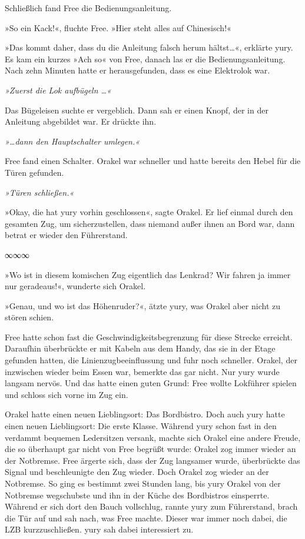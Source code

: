 Schließlich fand Free die Bedienungsanleitung.

»So ein Kack!«, fluchte Free. »Hier steht alles auf Chinesisch!«

»Das kommt daher, dass du die Anleitung falsch herum hältst…«, erklärte yury. Es kam ein kurzes »Ach so« von Free, danach las er die Bedienungsanleitung. Nach zehn Minuten hatte er herausgefunden, dass es eine Elektrolok war.

\textit{»Zuerst die Lok aufbügeln …«}

Das Bügeleisen suchte er vergeblich. Dann sah er einen Knopf, der in der Anleitung abgebildet war. Er drückte ihn.

\textit{»…dann den Hauptschalter umlegen.«}

Free fand einen Schalter. Orakel war schneller und hatte bereits den Hebel für die Türen gefunden.

\textit{»Türen schließen.«}

»Okay, die hat yury vorhin geschlossen«, sagte Orakel. Er lief einmal durch den gesamten Zug, um sicherzustellen, dass niemand außer ihnen an Bord war, dann betrat er wieder den Führerstand.

\begin{center}
    ∞∞∞
\end{center}

»Wo ist in diesem komischen Zug eigentlich das Lenkrad? Wir fahren ja immer nur geradeaus!«, wunderte sich Orakel.

»Genau, und wo ist das Höhenruder?«, ätzte yury, was Orakel aber nicht zu stören schien.

Free hatte schon fast die Geschwindigkeitsbegrenzung für diese Strecke erreicht. Daraufhin überbrückte er mit Kabeln aus dem Handy, das sie in der Etage gefunden hatten, die Linienzugbeeinflussung und fuhr noch schneller. Orakel, der inzwischen wieder beim Essen war, bemerkte das gar nicht. Nur yury wurde langsam nervös. Und das hatte einen guten Grund: Free wollte Lokführer spielen und schloss sich vorne im Zug ein.

Orakel hatte einen neuen Lieblingsort: Das Bordbistro. Doch auch yury hatte einen neuen Lieblingsort: Die erste Klasse. Während yury schon fast in den verdammt bequemen Ledersitzen versank, machte sich Orakel eine andere Freude, die so überhaupt gar nicht von Free begrüßt wurde: Orakel zog immer wieder an der Notbremse. Free ärgerte sich, dass der Zug langsamer wurde, überbrückte das Signal und beschleunigte den Zug wieder. Doch Orakel zog wieder an der Notbremse. So ging es bestimmt zwei Stunden lang, bis yury Orakel von der Notbremse wegschubste und ihn in der Küche des Bordbistros einsperrte. Während er sich dort den Bauch vollschlug, rannte yury zum Führerstand, brach die Tür auf und sah nach, was Free machte. Dieser war immer noch dabei, die LZB kurzzuschließen. yury sah dabei interessiert zu.

